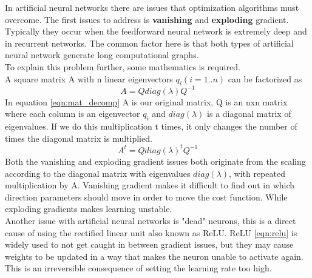 In artificial neural networks there are issues that optimization algorithms must overcome. The first issues to address is \textbf{vanishing} and \textbf{exploding} gradient. Typically they occur when the feedforward neural network is extremely deep and in recurrent networks. The common factor here is that both types of artificial neural network generate long computational graphs. \\
To explain this problem further, some mathematics is required.\\
A square matrix A with n linear eigenvectors $q_i (i=1..n)$ can be factorized as
\begin{equation} \label{eqn:mat_decomp}
    A=Q diag(\lambda) Q^{-1} 
\end{equation}
In equation \ref{eqn:mat_decomp} A is our original matrix, Q is an nxn matrix where each column is an eigenvector $q_i$ and $diag(\lambda)$ is a diagonal matrix of eigenvalues. If we do this multiplication t times, it only changes the number of times the diagonal matrix is multiplied. \cite{weisstein_eigen_????}
\begin{equation} \label{eqn:mat_decomp_t}
    A^{t} = Q diag(\lambda)^{t} Q^{-1}
\end{equation}
Both the vanishing and exploding gradient issues both originate from the scaling according to the diagonal matrix with eigenvalues $diag(\lambda)$, with repeated multiplication by A. Vanishing gradient makes it difficult to find out in which direction parameters should move in order to move the cost function. While exploding gradients makes learning unstable. \cite{goodfellow_deep_2016} \\

Another issue with artificial neural networks is "dead" neurons, this is a direct cause of using the rectified linear unit also known as ReLU. ReLU \ref{eqn:relu} is widely used to not get caught in between gradient issues, but they may cause weights to be updated in a way that makes the neuron unable to activate again. This is an irreversible consequence of setting the learning rate too high.\cite{_cs231n_????}

